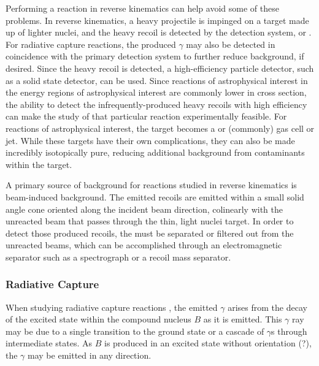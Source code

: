 Performing a reaction in reverse kinematics can help avoid some of these
problems. In reverse kinematics, a heavy projectile is impinged on a target
made up of lighter nuclei, and the heavy recoil is detected by the detection
system, or . For radiative capture reactions, the produced
$\gamma$ may also be detected in coincidence with the primary detection system
to further reduce background, if desired. Since the heavy recoil is detected, a
high-efficiency particle detector, such as a solid state detector, can be used.
Since reactions of astrophysical interest in the energy regions of
astrophysical interest are commonly lower in cross section, the ability to
detect the infrequently-produced heavy recoils with high efficiency can make
the study of that particular reaction experimentally feasible. For reactions of
astrophysical interest, the target becomes a  or 
(commonly) gas cell or jet. While these targets have their own complications,
they can also be made incredibly isotopically pure, reducing additional
background from contaminants within the target.

A primary source of background for reactions studied in reverse kinematics is
beam-induced background. The emitted recoils are emitted within a small solid
angle cone oriented along the incident beam direction, colinearly with the
unreacted beam that passes through the thin, light nuclei target. In order to
detect those produced recoils, the must be separated or filtered out from the
unreacted beams, which can be accomplished through an electromagnetic separator
such as a spectrograph or a recoil mass separator.

\subsubsection{Radiative Capture}


When studying radiative capture reactions , the emitted
$\gamma$ arises from the decay of the excited state within the compound nucleus
$B$ as it is emitted. This $\gamma$ ray may be due to a single transition to
the ground state or a cascade of $\gamma$s through intermediate states. As $B$
is produced in an excited state without orientation (?), the $\gamma$ may be
emitted in any direction.


